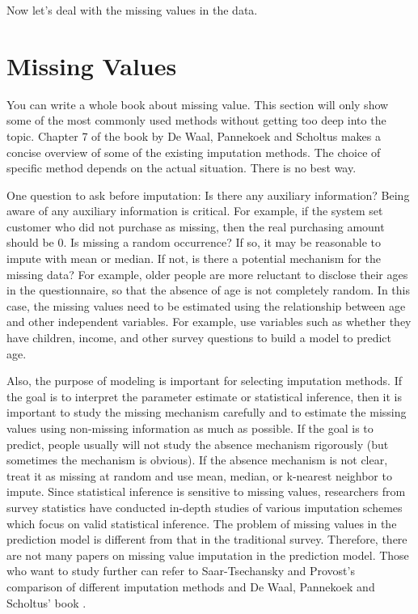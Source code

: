 \documentclass[12pt,]{krantz}
\begin{document}
Now let's deal with the missing values in the data.

\hypertarget{missing-values}{%
\section{Missing Values}\label{missing-values}}

You can write a whole book about missing value. This section will only show some of the most commonly used methods without getting too deep into the topic. Chapter 7 of the book by De Waal, Pannekoek and Scholtus \citep{Ton2011} makes a concise overview of some of the existing imputation methods. The choice of specific method depends on the actual situation. There is no best way.

One question to ask before imputation: Is there any auxiliary information? Being aware of any auxiliary information is critical. For example, if the system set customer who did not purchase as missing, then the real purchasing amount should be 0. Is missing a random occurrence? If so, it may be reasonable to impute with mean or median. If not, is there a potential mechanism for the missing data? For example, older people are more reluctant to disclose their ages in the questionnaire, so that the absence of age is not completely random. In this case, the missing values need to be estimated using the relationship between age and other independent variables. For example, use variables such as whether they have children, income, and other survey questions to build a model to predict age.

Also, the purpose of modeling is important for selecting imputation methods. If the goal is to interpret the parameter estimate or statistical inference, then it is important to study the missing mechanism carefully and to estimate the missing values using non-missing information as much as possible. If the goal is to predict, people usually will not study the absence mechanism rigorously (but sometimes the mechanism is obvious). If the absence mechanism is not clear, treat it as missing at random and use mean, median, or k-nearest neighbor to impute. Since statistical inference is sensitive to missing values, researchers from survey statistics have conducted in-depth studies of various imputation schemes which focus on valid statistical inference. The problem of missing values in the prediction model is different from that in the traditional survey. Therefore, there are not many papers on missing value imputation in the prediction model. Those who want to study further can refer to Saar-Tsechansky and Provost's comparison of different imputation methods \citep{missing1} and De Waal, Pannekoek and Scholtus' book \citep{Ton2011}.
\end{document}
